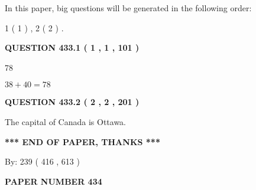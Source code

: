 \documentclass[12pt]{article}
\begin{document}
In this paper, big questions will be generated in the following order: 
   
   
   1 ( 1 )
 ,
   2 ( 2 )
 .
  
\vspace{0.2in}
  
{\textbf{\Large{QUESTION
433.1 
 ( 1 , 1 , 101 )
}}}
  
  
 
 
\noindent{}

78
 
 
 
 
\noindent{}

$ %
38 +  %
40=   %
78$
 
 
  
\vspace{0.2in}
  
{\textbf{\Large{QUESTION
433.2 
 ( 2 , 2 , 201 )
}}}
  
  
 
 
\noindent{}
 
 
The capital of Canada is Ottawa.
 
 
 
 
   
   
 \vspace{0.2in}
 
   
   
   
   
\vspace{1.0in} 
{\textbf{\large{ *** END OF PAPER, THANKS *** }}} 
   
   
\hspace{1.0in} By: 
 239 ( 416 ,  613 )
   
   
   
   
\newpage 
\setcounter{page}{ 
   434001 } 
   
   
   
   
 {\textbf{ \Large{ PAPER NUMBER  434  }}}
   
   
\vspace{0.2in}
   
   
   
   
   
\end{document}
